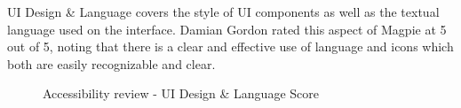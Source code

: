 \newpage
UI Design \& Language covers the style of UI components as well as the textual language used on the interface. Damian Gordon rated this aspect of Magpie at 5 out of 5, noting that there is a clear and effective use of language and icons which both are easily recognizable and clear.
\begin{figure}
    \centering
    \caption{Accessibility review - UI Design \& Language Score}
\end{figure}

